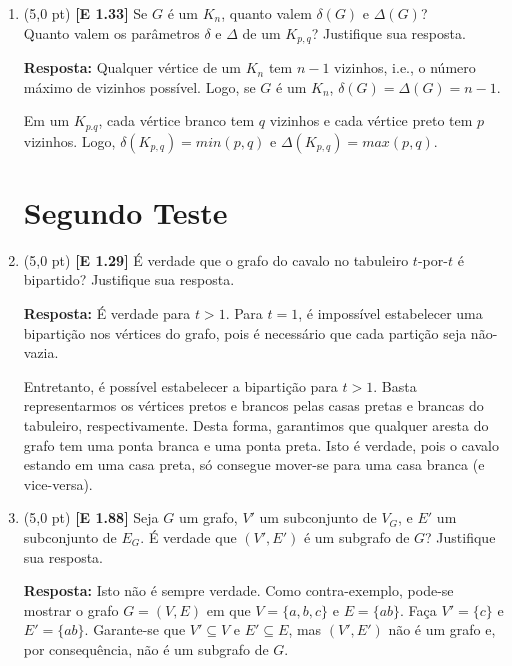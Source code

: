 \documentclass[12pt,a4paper,oneside]{article}
\begin{document}
\begin{enumerate}
\begin{enumerate}
		{\color{blue} {\bf Resposta:}
			Todo grafo $r$-regular de $n$ vértices tem $rn/2$ arestas. Cada vértice $v$ de um $Q_k$ tem grau $k$. Isto é verdade, pois cada um de seus vizinhos tem apenas um bit distinto de $v$. Logo, o $Q_k$ é $k$-regular e tem $2^k \times (k/2)$ arestas.
		} 
	\end{enumerate}
	
	\newpage
	
	\item (5,0 pt) {\bf [E 1.33]} Se $G$ é um $K_n$, quanto valem $\delta(G)$ e $\Delta(G)$? \\Quanto valem os parâmetros $\delta$ e $\Delta$ de um $K_{p,q}$? Justifique sua resposta.
	
	\vspace*{0.1cm} 
	
	{\color{blue} {\bf Resposta:}
		Qualquer vértice de um $K_n$ tem $n-1$ vizinhos, i.e., o número máximo de vizinhos possível. Logo, se $G$ é um $K_n$, $\delta(G) = \Delta(G) = n-1$.
		
		Em um $K_{p.q}$, cada vértice branco tem $q$ vizinhos e cada vértice preto tem $p$ vizinhos. Logo, $\delta(K_{p,q}) = min(p,q)$ e $\Delta(K_{p,q}) = max(p,q)$.
	} 
	
	\section*{Segundo Teste}
	
	\item (5,0 pt) {\bf [E 1.29]} É verdade que o grafo do cavalo no tabuleiro $t$-por-$t$ é bipartido? Justifique sua resposta.
	
	\vspace*{0.1cm} 
	
	{\color{blue} {\bf Resposta:}
		É verdade para $t>1$. Para $t=1$, é impossível estabelecer uma bipartição nos vértices do grafo, pois é necessário que cada partição seja não-vazia.
		
		Entretanto, é possível estabelecer a bipartição para $t>1$. Basta representarmos os vértices pretos e brancos pelas casas pretas e brancas do tabuleiro, respectivamente. Desta forma, garantimos que qualquer aresta do grafo tem uma ponta branca e uma ponta preta. Isto é verdade, pois o cavalo estando em uma casa preta, só consegue mover-se para uma casa branca (e vice-versa). 
	} 
	
	\item (5,0 pt) {\bf [E 1.88]} Seja $G$ um grafo, $V'$ um subconjunto de $V_G$, e $E'$ um subconjunto de $E_G$. É verdade que $(V', E')$ é um subgrafo de $G$? Justifique sua resposta.
	
	\vspace*{0.1cm} 
	
	{\color{blue} {\bf Resposta:}
		Isto não é sempre verdade. Como contra-exemplo, pode-se mostrar o grafo $G = (V, E)$ em que $V = \{a, b, c\}$ e $E = \{ab\}$. Faça $V' = \{c\}$ e $E' = \{ab\}$. Garante-se que $V' \subseteq V$ e $E' \subseteq E$, mas $(V', E')$ não é um grafo e, por consequência, não é um subgrafo de $G$.
	} 
	
	\end{enumerate}
\end{document}

